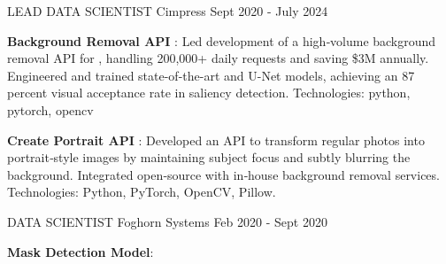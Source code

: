 
\begin{cventries}

    \cventry
    {LEAD DATA SCIENTIST} %
    {Cimpress} %
    {} %
    {Sept 2020 - July 2024} %
    {
      \begin{cvitems} %
      \item{\textbf{Background Removal API} : \newline 
      Led development of a high‐volume background removal API for ,  
      handling 200,000+ daily requests and saving \$3M annually. \newline 
      Engineered and trained state-of-the-art  and 
      U-Net models, achieving an 87 percent visual acceptance rate in saliency 
      detection. \newline 
      Technologies: python, pytorch, opencv }
      \item{\textbf{Create Portrait API} : \newline
      Developed an API to transform regular photos into portrait‐style images by maintaining subject focus and subtly blurring the background.
      \newline 
      Integrated open‐source  with in‐house background removal services.
      \newline
      Technologies: Python, PyTorch, OpenCV, Pillow. }
	\end{cvitems}
    }
\vspace{2em} %
  \cventry
    {DATA SCIENTIST} %
    {Foghorn Systems} %
    {} %
    {Feb 2020 - Sept 2020} %
    {
      \begin{cvitems} %
        \item{\textbf{Mask Detection Model}: \newline 
}
\end{cvitems}}
\end{cventries}
